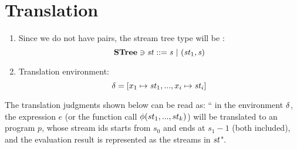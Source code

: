 \section{Translation}

\begin{enumerate}[(1)]
	\item Since we do not have pairs, the stream tree type will be : $$ \STree \ni \st ::= \s \ | \ (\st_1,\s) $$

%	
	
	\item Translation environment: $$\del = [x_1 \|-> \st_1,..., x_i \|-> {\st_i}] $$ 
\end{enumerate}
	
The translation judgments shown below can be read as: `` in the environment $\delta$, the expression $e$ (or the function call $\phi(st_1,...,st_k)$) will be translated to an \fmsvcode program $p$, whose stream ids starts from $s_0$ and ends at $s_1-1$ (both included), and the evaluation result is represented as the streams in $\mathit{st}$". 
	
